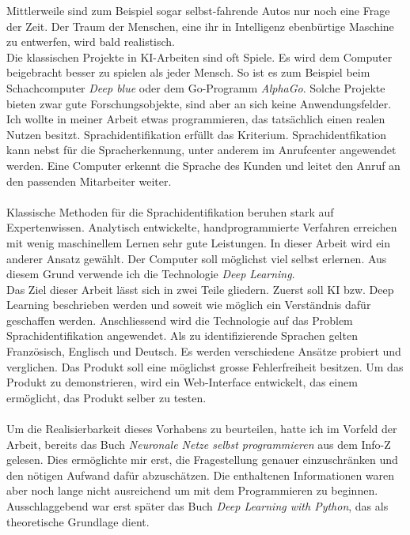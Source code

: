 Mittlerweile sind zum Beispiel sogar selbst-fahrende Autos nur noch eine Frage der Zeit. Der Traum der Menschen, eine ihr in Intelligenz ebenbürtige Maschine zu entwerfen, wird bald realistisch.
\\
Die klassischen Projekte in KI-Arbeiten sind oft Spiele. Es wird dem Computer beigebracht besser zu spielen als jeder Mensch. So ist es zum Beispiel beim Schachcomputer
\textit{Deep blue}\parencite{deepblue} oder dem Go-Programm \textit{AlphaGo}\parencite{alphago}.
Solche Projekte bieten zwar gute Forschungsobjekte, sind aber an sich keine Anwendungsfelder. Ich wollte in meiner Arbeit etwas programmieren, das tatsächlich einen realen Nutzen
besitzt.
Sprachidentifikation erfüllt das Kriterium. Sprachidentfikation kann nebst für die Spracherkennung, unter anderem im Anrufcenter angewendet werden. Eine Computer erkennt die Sprache des Kunden und leitet den Anruf an den passenden Mitarbeiter weiter.
\\ \\
Klassische Methoden für die Sprachidentifikation beruhen stark auf Expertenwissen. Analytisch entwickelte, handprogrammierte Verfahren erreichen mit wenig maschinellem Lernen sehr gute Leistungen. In dieser Arbeit wird ein anderer Ansatz gewählt. Der Computer soll möglichst viel selbst erlernen. Aus diesem Grund verwende ich die Technologie \textit{Deep Learning}. 
\\ 
Das Ziel dieser Arbeit lässt sich in zwei Teile gliedern. Zuerst soll KI bzw. Deep Learning beschrieben werden und soweit wie möglich ein Verständnis dafür geschaffen werden.
Anschliessend wird die Technologie auf das Problem Sprachidentifikation angewendet. Als zu identifizierende Sprachen gelten Französisch, Englisch und Deutsch. Es
werden verschiedene Ansätze probiert und verglichen. Das Produkt soll eine möglichst grosse Fehlerfreiheit besitzen. Um das Produkt zu demonstrieren, wird ein Web-Interface
entwickelt, das einem ermöglicht, das Produkt selber zu testen.
\\ \\
Um die Realisierbarkeit dieses Vorhabens zu beurteilen, hatte ich im Vorfeld der Arbeit, bereits das Buch  \textit{Neuronale Netze selbst programmieren}\parencite{neuronale_netze} aus dem Info-Z gelesen. Dies ermöglichte mir erst, die Fragestellung genauer einzuschränken und den nötigen Aufwand dafür abzuschätzen. Die enthaltenen Informationen waren aber noch lange nicht ausreichend um mit dem Programmieren zu beginnen. Ausschlaggebend war erst später das Buch \textit{Deep Learning with Python}\parencite{chollet}, das als theoretische Grundlage dient. 
